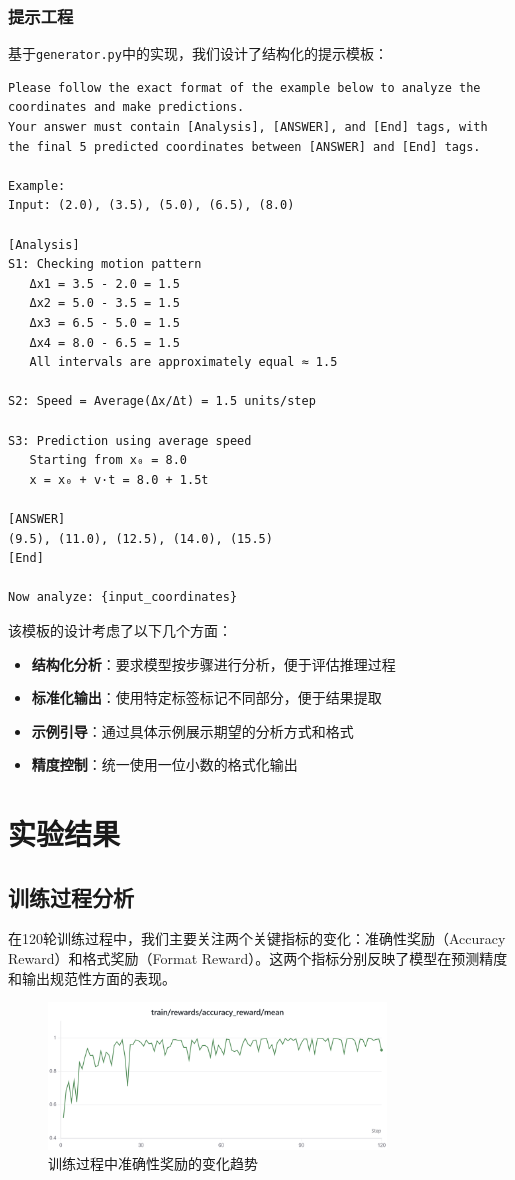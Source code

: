 \documentclass[a4paper, 12pt]{article}
\begin{document}
\subsubsection{提示工程}
基于\texttt{generator.py}中的实现，我们设计了结构化的提示模板：

\begin{verbatim}
Please follow the exact format of the example below to analyze the coordinates and make predictions.
Your answer must contain [Analysis], [ANSWER], and [End] tags, with the final 5 predicted coordinates between [ANSWER] and [End] tags.

Example:
Input: (2.0), (3.5), (5.0), (6.5), (8.0)

[Analysis]
S1: Checking motion pattern
   Δx1 = 3.5 - 2.0 = 1.5
   Δx2 = 5.0 - 3.5 = 1.5
   Δx3 = 6.5 - 5.0 = 1.5
   Δx4 = 8.0 - 6.5 = 1.5
   All intervals are approximately equal ≈ 1.5

S2: Speed = Average(Δx/Δt) = 1.5 units/step

S3: Prediction using average speed
   Starting from x₀ = 8.0
   x = x₀ + v·t = 8.0 + 1.5t

[ANSWER]
(9.5), (11.0), (12.5), (14.0), (15.5)
[End]

Now analyze: {input_coordinates}
\end{verbatim}

该模板的设计考虑了以下几个方面：
\begin{itemize}
    \item \textbf{结构化分析}：要求模型按步骤进行分析，便于评估推理过程
    \item \textbf{标准化输出}：使用特定标签标记不同部分，便于结果提取
    \item \textbf{示例引导}：通过具体示例展示期望的分析方式和格式
    \item \textbf{精度控制}：统一使用一位小数的格式化输出
\end{itemize}

\section{实验结果}
\subsection{训练过程分析}
在120轮训练过程中，我们主要关注两个关键指标的变化：准确性奖励（Accuracy Reward）和格式奖励（Format Reward）。这两个指标分别反映了模型在预测精度和输出规范性方面的表现。

\begin{figure}[htbp]
    \centering
    \includegraphics[width=0.8\textwidth]{Images/accuracy_reward.png}
    \caption{训练过程中准确性奖励的变化趋势}
    \label{fig:accuracy_reward}
\end{figure}
\end{document}
